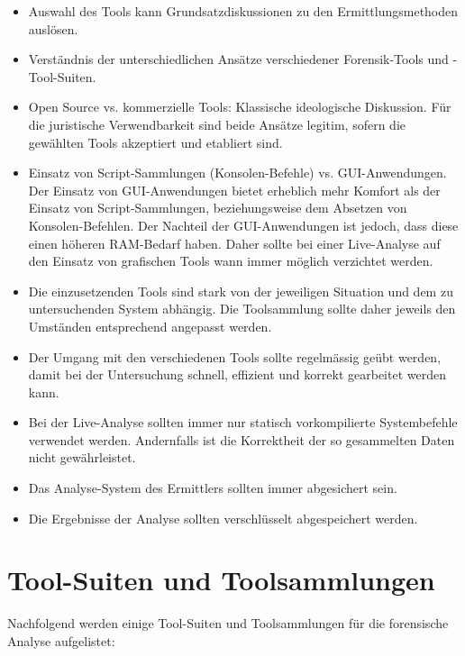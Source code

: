 \begin{itemize}
\item Auswahl des Tools kann Grundsatzdiskussionen zu den Ermittlungsmethoden auslösen.
\item Verständnis der unterschiedlichen Ansätze verschiedener Forensik-Tools und -Tool-Suiten.
\item Open Source vs. kommerzielle Tools: Klassische ideologische Diskussion. Für die juristische Verwendbarkeit sind beide Ansätze legitim, sofern die gewählten Tools akzeptiert und etabliert sind.
\item Einsatz von Script-Sammlungen (Konsolen-Befehle) vs. GUI-Anwendungen. Der Einsatz von GUI-Anwendungen bietet erheblich mehr Komfort als der Einsatz von Script-Sammlungen, beziehungsweise dem Absetzen von Konsolen-Befehlen. Der Nachteil der GUI-Anwendungen ist jedoch, dass diese einen höheren RAM-Bedarf haben. Daher sollte bei einer Live-Analyse auf den Einsatz von grafischen Tools wann immer möglich verzichtet werden.
\item Die einzusetzenden Tools sind stark von der jeweiligen Situation und dem zu untersuchenden System abhängig. Die Toolsammlung sollte daher jeweils den Umständen entsprechend angepasst werden.
\item Der Umgang mit den verschiedenen Tools sollte regelmässig geübt werden, damit bei der Untersuchung schnell, effizient und korrekt gearbeitet werden kann.
\item Bei der Live-Analyse sollten immer nur statisch vorkompilierte Systembefehle verwendet werden. Andernfalls ist die Korrektheit der so gesammelten Daten nicht gewährleistet.
\item Das Analyse-System des Ermittlers sollten immer abgesichert sein.
\item Die Ergebnisse der Analyse sollten verschlüsselt abgespeichert werden.
\end{itemize}



\section{Tool-Suiten und Toolsammlungen}
Nachfolgend werden einige Tool-Suiten und Toolsammlungen für die forensische Analyse aufgelistet:

